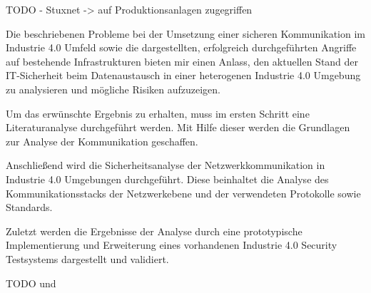 TODO - Stuxnet -> auf Produktionsanlagen zugegriffen

Die beschriebenen Probleme bei der Umsetzung einer sicheren Kommunikation im Industrie 4.0 Umfeld sowie die dargestellten, erfolgreich durchgeführten Angriffe auf bestehende Infrastrukturen bieten mir einen Anlass, den aktuellen Stand der IT-Sicherheit beim Datenaustausch in einer heterogenen Industrie 4.0 Umgebung zu analysieren und mögliche Risiken aufzuzeigen.

Um das erwünschte Ergebnis zu erhalten, muss im ersten Schritt eine Literaturanalyse durchgeführt werden. Mit Hilfe dieser werden die Grundlagen zur Analyse der Kommunikation geschaffen. 

Anschließend wird die Sicherheitsanalyse der Netzwerkkommunikation in Industrie 4.0 Umgebungen durchgeführt. Diese beinhaltet die Analyse des Kommunikationsstacks der Netzwerkebene und der verwendeten Protokolle sowie Standards.

Zuletzt werden die Ergebnisse der Analyse durch eine prototypische Implementierung und Erweiterung eines vorhandenen Industrie 4.0 Security Testsystems dargestellt und validiert. 

TODO
\cite{Halang2016}
und
\cite{BMWiSuK2016}